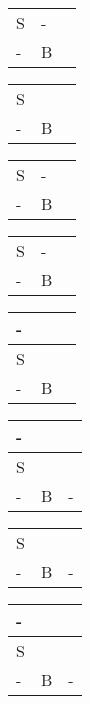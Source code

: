 \documentclass{article}
\newcommand{\wombat}{\cellcolor{newred}}
\newcommand{\pit}{\cellcolor{newblue}}
\newcommand{\wompit}{\cellcolor{newpurple}}
\begin{document}
	\begin{center}
		\begin{tabular}{|m{0.25cm}|m{0.25cm}|m{0.25cm}|}
			\hline
			\pit &&  \\ \hline
			S & - &\\ \hline
			- & B & \wompit \\ \hline
		\end{tabular}
		\quad
		\begin{tabular}{|m{0.25cm}|m{0.25cm}|m{0.25cm}|}
			\hline
			\pit &&  \\ \hline
			S & \wombat & \\ \hline
			- & B & \pit \\ \hline
		\end{tabular}
		\quad
		\begin{tabular}{|m{0.25cm}|m{0.25cm}|m{0.25cm}|}
			\hline
			\wompit &&  \\ \hline
			S & - & \\ \hline
			- & B & \pit \\ \hline
		\end{tabular}
		\quad
		\begin{tabular}{|m{0.25cm}|m{0.25cm}|m{0.25cm}|}
			\hline
			\pit &&  \\ \hline
			S & - & \\ \hline
			- & B & \pit \\ \hline
		\end{tabular}
	\end{center}

	\begin{center}
		\begin{tabular}{|m{0.25cm}|m{0.25cm}|m{0.25cm}|}
			\hline
			- &&  \\ \hline
			S & \pit &\\ \hline
			- & B & \wombat \\ \hline
		\end{tabular}
		\quad
		\begin{tabular}{|m{0.25cm}|m{0.25cm}|m{0.25cm}|}
			\hline
			- &&  \\ \hline
			S & \wompit & \\ \hline
			- & B & - \\ \hline
		\end{tabular}
		\quad
		\begin{tabular}{|m{0.25cm}|m{0.25cm}|m{0.25cm}|}
			\hline
			\wombat &&  \\ \hline
			S & \pit & \\ \hline
			- & B & - \\ \hline
		\end{tabular}
		\quad
		\begin{tabular}{|m{0.25cm}|m{0.25cm}|m{0.25cm}|}
			\hline
			- &&  \\ \hline
			S & \pit & \\ \hline
			- & B & - \\ \hline
		\end{tabular}
	\end{center}
\end{document}
